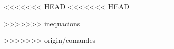 \documentclass[10pt,a4paper]{article}
\begin{document}
<<<<<<< HEAD
<<<<<<< HEAD
=======

>>>>>>> inequacions
=======


>>>>>>> origin/comandes
\end{document}
